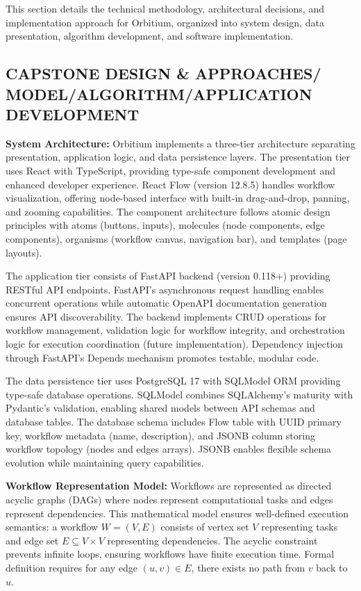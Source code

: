 \documentclass[12pt]{article}
\begin{document}
\hspace{\parindent}This section details the technical methodology, architectural decisions, and implementation approach for Orbitium, organized into system design, data presentation, algorithm development, and software implementation.

\subsection{CAPSTONE DESIGN \& APPROACHES/ MODEL/ALGORITHM/APPLICATION DEVELOPMENT}

\hspace{\parindent}\textbf{System Architecture:} Orbitium implements a three-tier architecture separating presentation, application logic, and data persistence layers. The presentation tier uses React with TypeScript, providing type-safe component development and enhanced developer experience. React Flow (version 12.8.5) handles workflow visualization, offering node-based interface with built-in drag-and-drop, panning, and zooming capabilities. The component architecture follows atomic design principles with atoms (buttons, inputs), molecules (node components, edge components), organisms (workflow canvas, navigation bar), and templates (page layouts).

The application tier consists of FastAPI backend (version 0.118+) providing RESTful API endpoints. FastAPI's asynchronous request handling enables concurrent operations while automatic OpenAPI documentation generation ensures API discoverability. The backend implements CRUD operations for workflow management, validation logic for workflow integrity, and orchestration logic for execution coordination (future implementation). Dependency injection through FastAPI's Depends mechanism promotes testable, modular code.

The data persistence tier uses PostgreSQL 17 with SQLModel ORM providing type-safe database operations. SQLModel combines SQLAlchemy's maturity with Pydantic's validation, enabling shared models between API schemas and database tables. The database schema includes Flow table with UUID primary key, workflow metadata (name, description), and JSONB column storing workflow topology (nodes and edges arrays). JSONB enables flexible schema evolution while maintaining query capabilities.

\hspace{\parindent}\textbf{Workflow Representation Model:} Workflows are represented as directed acyclic graphs (DAGs) where nodes represent computational tasks and edges represent dependencies. This mathematical model ensures well-defined execution semantics: a workflow $W = (V, E)$ consists of vertex set $V$ representing tasks and edge set $E \subseteq V \times V$ representing dependencies. The acyclic constraint prevents infinite loops, ensuring workflows have finite execution time. Formal definition requires for any edge $(u, v) \in E$, there exists no path from $v$ back to $u$.
\end{document}
